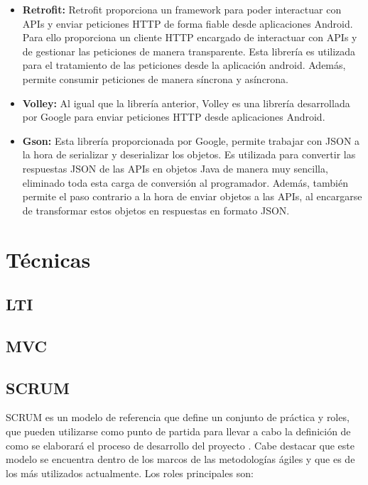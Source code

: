 \begin{itemize}

	\item \textbf{Retrofit:} Retrofit proporciona un framework para poder interactuar con APIs y enviar peticiones HTTP de forma fiable desde aplicaciones Android. Para ello proporciona un cliente HTTP encargado de interactuar con APIs y de gestionar las peticiones de manera transparente.
Esta librería es utilizada para el tratamiento de las peticiones desde la aplicación android. Además, permite consumir peticiones de manera síncrona y asíncrona. \cite{wiki:retrofit}
	
	\item \textbf{Volley:} Al igual que la librería anterior, Volley es una librería desarrollada por Google para enviar peticiones HTTP desde aplicaciones Android. \cite{wiki:volley}
	
	\item \textbf{Gson:} Esta librería proporcionada por Google, permite trabajar con JSON a la hora de serializar y deserializar los objetos. Es utilizada para convertir las respuestas JSON de las APIs en objetos Java de manera muy sencilla, eliminado toda esta carga de conversión al programador. Además, también permite el paso contrario a la hora de enviar objetos a las APIs, al encargarse de transformar estos objetos en respuestas en formato JSON. \cite{wiki:gson}

\end{itemize}

\section{Técnicas}

\subsection{LTI}
\subsection{MVC}
\subsection{SCRUM}

SCRUM es un modelo de referencia que define un conjunto de práctica y roles, que pueden utilizarse como punto de partida para llevar a cabo la definición de como se elaborará el proceso de desarrollo del proyecto \cite{wiki:scrum}. Cabe destacar que este modelo se encuentra dentro de los marcos de las metodologías ágiles y que es de los más utilizados actualmente.
Los roles principales son:

